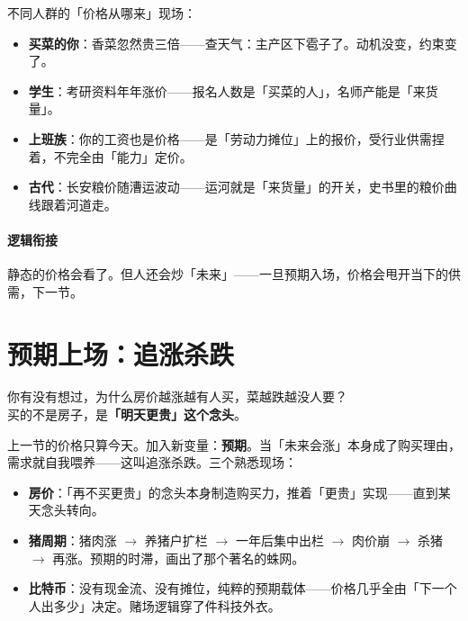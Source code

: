 \documentclass[../../main2.tex]{subfiles}
\begin{document}
不同人群的「价格从哪来」现场：

\begin{itemize}
	\item \textbf{买菜的你}：香菜忽然贵三倍——查天气：主产区下雹子了。动机没变，约束变了。
	\item \textbf{学生}：考研资料年年涨价——报名人数是「买菜的人」，名师产能是「来货量」。
	\item \textbf{上班族}：你的工资也是价格——是「劳动力摊位」上的报价，受行业供需捏着，不完全由「能力」定价。
	\item \textbf{古代}：长安粮价随漕运波动——运河就是「来货量」的开关，史书里的粮价曲线跟着河道走。
\end{itemize}

\paragraph*{逻辑衔接}
	静态的价格会看了。但人还会炒「未来」——一旦预期入场，价格会甩开当下的供需，下一节。

\section{预期上场：追涨杀跌}

\begin{readingnote}
	你有没有想过，为什么房价越涨越有人买，菜越跌越没人要？\\
	买的不是房子，是\textbf{「明天更贵」这个念头}。
\end{readingnote}

上一节的价格只算今天。加入新变量：\textbf{预期}。当「未来会涨」本身成了购买理由，需求就自我喂养——这叫追涨杀跌。三个熟悉现场：

\begin{itemize}
	\item \textbf{房价}：「再不买更贵」的念头本身制造购买力，推着「更贵」实现——直到某天念头转向。
	\item \textbf{猪周期}：猪肉涨 $\rightarrow$ 养猪户扩栏 $\rightarrow$ 一年后集中出栏 $\rightarrow$ 肉价崩 $\rightarrow$ 杀猪 $\rightarrow$ 再涨。预期的时滞，画出了那个著名的蛛网。
	\item \textbf{比特币}：没有现金流、没有摊位，纯粹的预期载体——价格几乎全由「下一个人出多少」决定。赌场逻辑穿了件科技外衣。
\end{itemize}

\end{document}
